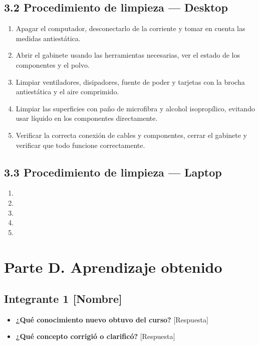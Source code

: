 \documentclass{article}
\begin{document}
\subsection{3.2 Procedimiento de limpieza — Desktop}
\label{sec:org5dbed30}
\begin{enumerate}
\item Apagar el computador, desconectarlo de la corriente y tomar en
cuenta las medidas antiestática.
\item Abrir el gabinete usando las herramientas necesarias, ver el
estado de los componentes y el polvo.
\item Limpiar ventiladores, disipadores, fuente de poder y tarjetas
con la brocha antiestática y el aire comprimido.
\item Limpiar las superficies con paño de microfibra y alcohol
isopropílico, evitando usar líquido en los componentes directamente.
\item Verificar la correcta conexión de cables y componentes, cerrar
el gabinete y verificar que todo funcione correctamente.
\end{enumerate}

\subsection{3.3 Procedimiento de limpieza — Laptop}
\label{sec:orgd6ecf42}
\begin{enumerate}
\item 

\item 

\item 

\item 

\item 
\end{enumerate}

\section{Parte D. Aprendizaje obtenido}
\label{sec:orgc7f1ee5}

\subsection{Integrante 1 [Nombre]}
\label{sec:org1a5cd66}
\begin{itemize}
\item \textbf{¿Qué conocimiento nuevo obtuvo del curso?} [Respuesta]
\item \textbf{¿Qué concepto corrigió o clarificó?} [Respuesta]
\end{itemize}
\end{document}

